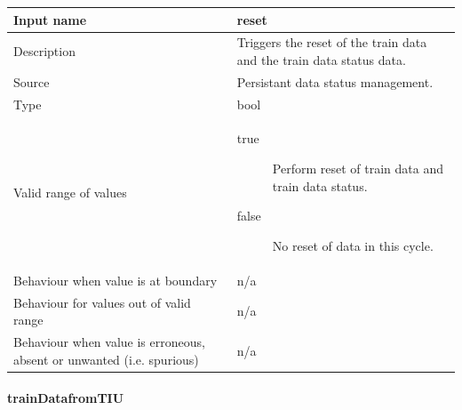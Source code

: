 \begin{longtable}{p{}p{}}
\toprule
Input name				& reset \\
\midrule
Description				& Triggers the reset of the train data and the train data status data.\\
\midrule
Source					& Persistant data status management.\\ 
\midrule
Type					& bool \\
\midrule
Valid range of values	& 
\begin{description}
\item[true] Perform reset of train data and train data status.
\item[false] No reset of data in this cycle.
\end{description}
\\
\midrule
Behaviour when value is at boundary	& n/a \\
\midrule
Behaviour for values out of valid range	& n/a \\
\midrule
Behaviour when value is erroneous, absent or unwanted (i.e. spurious) & n/a \\
\bottomrule
\end{longtable}

\paragraph{trainDatafromTIU}

